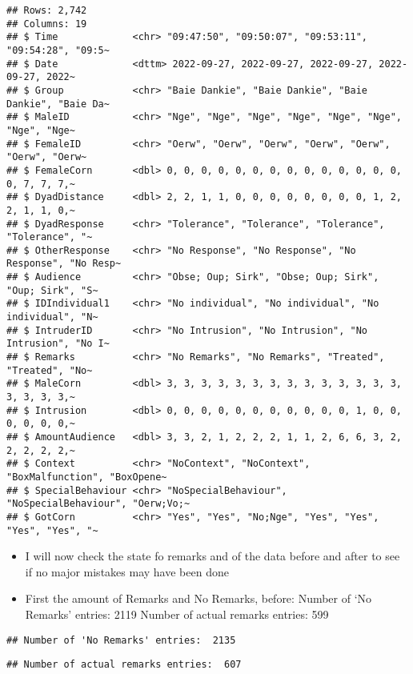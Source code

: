 \documentclass[
]{article}
\begin{document}
\begin{verbatim}
## Rows: 2,742
## Columns: 19
## $ Time             <chr> "09:47:50", "09:50:07", "09:53:11", "09:54:28", "09:5~
## $ Date             <dttm> 2022-09-27, 2022-09-27, 2022-09-27, 2022-09-27, 2022~
## $ Group            <chr> "Baie Dankie", "Baie Dankie", "Baie Dankie", "Baie Da~
## $ MaleID           <chr> "Nge", "Nge", "Nge", "Nge", "Nge", "Nge", "Nge", "Nge~
## $ FemaleID         <chr> "Oerw", "Oerw", "Oerw", "Oerw", "Oerw", "Oerw", "Oerw~
## $ FemaleCorn       <dbl> 0, 0, 0, 0, 0, 0, 0, 0, 0, 0, 0, 0, 0, 0, 0, 7, 7, 7,~
## $ DyadDistance     <dbl> 2, 2, 1, 1, 0, 0, 0, 0, 0, 0, 0, 0, 1, 2, 2, 1, 1, 0,~
## $ DyadResponse     <chr> "Tolerance", "Tolerance", "Tolerance", "Tolerance", "~
## $ OtherResponse    <chr> "No Response", "No Response", "No Response", "No Resp~
## $ Audience         <chr> "Obse; Oup; Sirk", "Obse; Oup; Sirk", "Oup; Sirk", "S~
## $ IDIndividual1    <chr> "No individual", "No individual", "No individual", "N~
## $ IntruderID       <chr> "No Intrusion", "No Intrusion", "No Intrusion", "No I~
## $ Remarks          <chr> "No Remarks", "No Remarks", "Treated", "Treated", "No~
## $ MaleCorn         <dbl> 3, 3, 3, 3, 3, 3, 3, 3, 3, 3, 3, 3, 3, 3, 3, 3, 3, 3,~
## $ Intrusion        <dbl> 0, 0, 0, 0, 0, 0, 0, 0, 0, 0, 0, 1, 0, 0, 0, 0, 0, 0,~
## $ AmountAudience   <dbl> 3, 3, 2, 1, 2, 2, 2, 1, 1, 2, 6, 6, 3, 2, 2, 2, 2, 2,~
## $ Context          <chr> "NoContext", "NoContext", "BoxMalfunction", "BoxOpene~
## $ SpecialBehaviour <chr> "NoSpecialBehaviour", "NoSpecialBehaviour", "Oerw;Vo;~
## $ GotCorn          <chr> "Yes", "Yes", "No;Nge", "Yes", "Yes", "Yes", "Yes", "~
\end{verbatim}

\begin{itemize}
\item
  I will now check the state fo remarks and of the data before and after
  to see if no major mistakes may have been done
\item
  First the amount of Remarks and No Remarks, before: Number of `No
  Remarks' entries: 2119 Number of actual remarks entries: 599
\end{itemize}

\begin{verbatim}
## Number of 'No Remarks' entries:  2135
\end{verbatim}

\begin{verbatim}
## Number of actual remarks entries:  607
\end{verbatim}
\end{document}
